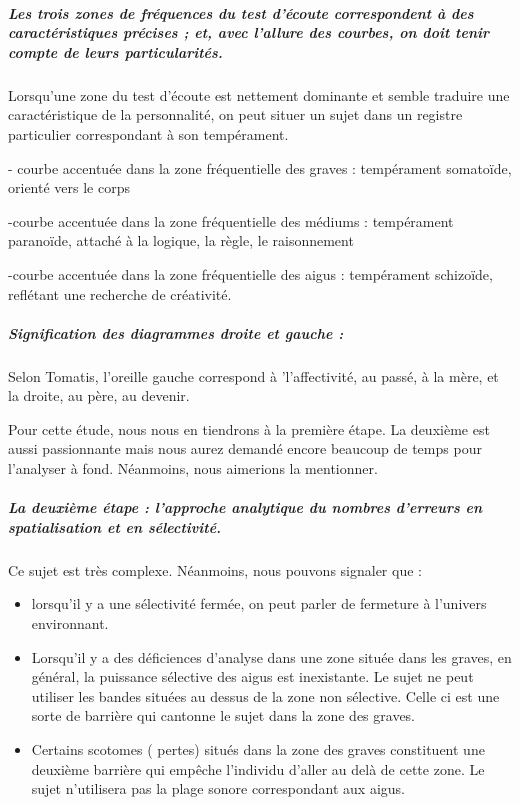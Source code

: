 \subparagraph{Les trois zones de fréquences du test d'écoute correspondent à des
caractéristiques précises ; et, avec l'allure des courbes, on doit
tenir compte de leurs particularités.}

Lorsqu'une zone du test d'écoute est nettement dominante et semble
traduire une caractéristique de la personnalité, on peut situer un
sujet dans un registre particulier correspondant à son tempérament.

- courbe accentuée dans la zone fréquentielle des graves : tempérament
somatoïde, orienté vers le corps

-courbe accentuée dans la zone fréquentielle des médiums : tempérament
paranoïde, attaché à la logique, la règle, le raisonnement 

-courbe accentuée dans la zone fréquentielle des aigus : tempérament
schizoïde, reflétant une recherche de créativité. 

\subparagraph{Signification des diagrammes droite et gauche : }

Selon Tomatis, l'oreille gauche correspond à \textquoteright l'affectivité,
au passé, à la mère, et la droite, au père, au devenir.

Pour cette étude, nous nous en tiendrons à la première étape. La deuxième est aussi passionnante mais nous aurez demandé encore beaucoup de temps pour l'analyser à fond. Néanmoins, nous aimerions la mentionner.

\subparagraph{La deuxième étape : l'approche analytique du nombres d'erreurs en
spatialisation et en sélectivité.}


Ce sujet est très complexe. Néanmoins, nous pouvons signaler que : 
\begin{itemize}
\item lorsqu'il y a une sélectivité fermée, on peut parler de fermeture
à l'univers environnant.
\item Lorsqu'il y a des déficiences d'analyse dans une zone située dans
les graves, en général, la puissance sélective des aigus est inexistante.
Le sujet ne peut utiliser les bandes situées au dessus de la zone
non sélective. Celle ci est une sorte de barrière qui cantonne le
sujet dans la zone des graves. 
\item Certains scotomes ( pertes) situés dans la zone des graves constituent
une deuxième barrière qui empêche l'individu d'aller au delà de cette
zone. Le sujet n'utilisera pas la plage sonore correspondant aux aigus. 
\end{itemize}

